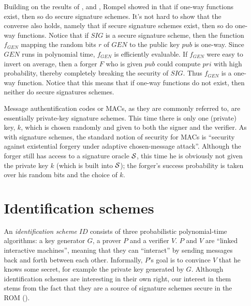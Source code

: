 Building on the results of \cite{goldwasser:signatures2},
\cite{bellare:trapdoorsigs1} and \cite{naor:universal}, Rompel showed in
\cite{rompel:1waysigs} that if one-way functions exist, then so do secure
signature schemes. It's not hard to show that the converse also holds,
namely that if secure signature schemes exist, then so do one-way functions.
Notice that if $SIG$ is a secure signature scheme, then the function $f_{GEN}$
mapping the random bits $r$ of $GEN$ to the public key $pub$ is one-way.
Since $GEN$ runs in polynomial time, $f_{GEN}$ is efficiently evaluable. If
$f_{GEN}$ were easy to invert on average, then a forger $F$ who is given $pub$ could compute
$pri$ with high probability, thereby completely breaking the security of
$SIG$. Thus $f_{GEN}$ is a one-way function. Notice that this means that if
one-way functions do not exist, then neither do secure signatures schemes.

Message authentification codes or MACs, as they are commonly referred to, are
essentially private-key signature schemes. This time there is only one
(private) key, $k$, which is chosen randomly and given to both the signer and
the verifier. As with signature schemes, the standard notion of security for
MACs is ``security against existential forgery under adaptive chosen-message attack''.
Although the forger still has access to a signature oracle $\mathcal{S}$, this time
he is obviously not given the private key $k$ (which is built into
$\mathcal{S}$); the forger's success probability is taken over his random bits and
the choice of $k$.

\section{Identification schemes}
\label{SEC:IDschemes}
An {\it identification scheme} $ID$ consists of three probabilistic
polynomial-time algorithms: a key generator $G$, a prover $P$ and a verifier $V$.
$P$ and $V$ are ``linked interactive machines'', meaning that they can
``interact'' by sending messages back and forth between each other.
Informally, $P$'s goal is to convince $V$ that he knows some secret, for
example the private key generated by $G$. Although identification schemes are
interesting in their own right, our interest in them stems from the
fact that they are a source of signature schemes secure in the
ROM (\cite{abdalla:fiatshamirrom}).

